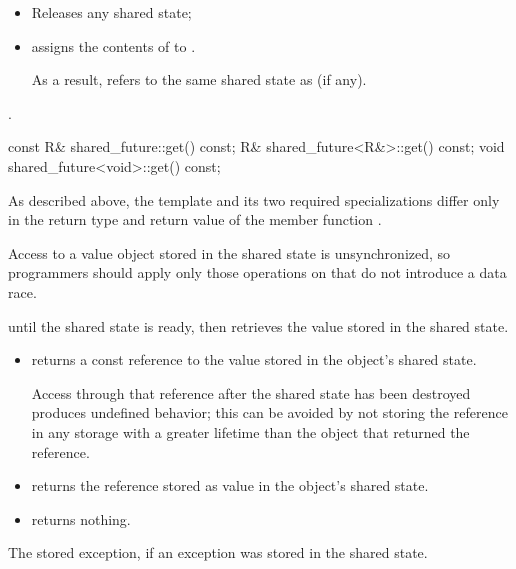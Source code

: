 \begin{itemdescr}
\pnum
\effects
\begin{itemize}
\item
Releases any shared state;
\item
assigns the contents of  to .
\begin{note}
As a result,
 refers to the same shared state as 
(if any).
\end{note}
\end{itemize}

\pnum
\ensures
{}.
\end{itemdescr}

%
\begin{itemdecl}
const R& shared_future::get() const;
R& shared_future<R&>::get() const;
void shared_future<void>::get() const;
\end{itemdecl}

\begin{itemdescr}
\pnum
\begin{note}
As described above, the template and its two required specializations differ only in
the return type and return value of the member function .
\end{note}

\pnum
\begin{note}
Access to a value object stored in the shared state is
unsynchronized, so programmers should apply only those operations on  that do not
introduce a data race.
\end{note}

\pnum
\effects
{} until the shared state is ready, then retrieves the
value stored in the shared state.

\pnum
\returns
\begin{itemize}
\item
{} returns a const reference to the value stored in the object's
shared state.
\begin{note}
Access through that reference after the shared state has been
destroyed produces undefined behavior; this can be avoided by not storing the reference in any
storage with a greater lifetime than the  object that returned the
reference.
\end{note}

\item
{} returns the reference stored as value in the object's
shared state.

\item
{} returns nothing.
\end{itemize}

\pnum
\throws
The stored exception, if an exception was stored in the shared state.
\end{itemdescr}

